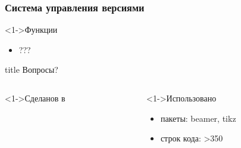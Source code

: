 \documentclass[pdf,9pt,aspectratio=169]{beamer}
\begin{document}
\begin{frame}\frametitle{Система управления версиями}
  \begin{block}<1->{Функции}
    \begin{itemize}
      \item ???
    \end{itemize}
  \end{block}
\end{frame}


\begin{frame}{}
  \vfill
  \begin{beamercolorbox}[sep=8pt,center,shadow=true,rounded=true]{title}
    Вопросы?
  \end{beamercolorbox}
  \vfill
  \begin{columns}[T]
    \begin{column}[]{0.45\textwidth}  
      \begin{exampleblock}<1->{Сделанов в}
        \begin{center}
           \Huge\LaTeXe
        \end{center}
      \end{exampleblock}
    \end{column}
    \begin{column}[]{0.45\textwidth}  
      \begin{block}<1->{Использовано}
        \begin{itemize}
          \item пакеты: beamer, tikz
          \item строк кода: >350 
        \end{itemize}
      \end{block}
    \end{column}
  \end{columns}
  \vfill
\end{frame}
\end{document}
